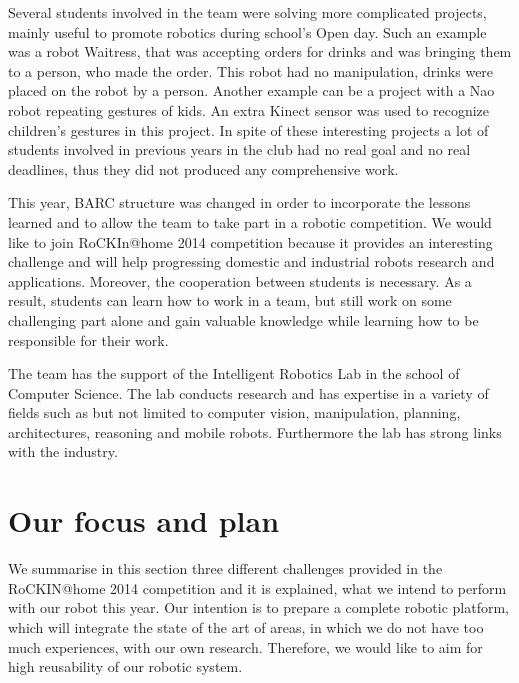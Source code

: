 \documentclass[conference]{IEEEtran}
\begin{document}
Several students involved in the team were solving more complicated projects, mainly useful to promote robotics during school's Open day. Such an example was a robot Waitress, that was accepting orders for drinks and was bringing them to a person, who made the order. This robot had no manipulation, drinks were placed on the robot by a person. Another example can be a project with a Nao robot repeating gestures of kids. An extra Kinect sensor was used to recognize children's gestures in this project. In spite of these interesting projects a lot of students involved in previous years in the club had no real goal and no real deadlines, thus they did not produced any comprehensive work.

This year, BARC structure was changed in order to incorporate the lessons learned and to allow the team to take part in a robotic competition. We would like to join RoCKIn@home 2014 competition because it provides an interesting challenge and will help progressing domestic and industrial robots research and applications. Moreover, the cooperation between students is necessary. As a result, students can learn how to work in a team, but still work on some challenging part alone and gain valuable knowledge while learning how to be responsible for their work.

The team has the support of the Intelligent Robotics Lab \cite{irlab} in the school of Computer Science. The lab conducts research and has expertise in a variety of fields such as but not limited to computer vision, manipulation, planning, architectures, reasoning and mobile robots. Furthermore the lab has strong links with the industry. 

 
\section{Our focus and plan}
We summarise in this section three different challenges provided in the RoCKIN@home 2014 competition and it is explained, what we intend to perform with our robot this year. Our intention is to prepare a complete robotic platform, which will integrate the state of the art of areas, in which we do not have too much experiences, with our own research. Therefore, we would like to aim for high reusability of our robotic system. 
\end{document}
